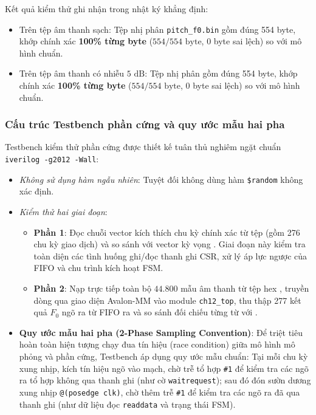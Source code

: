 Kết quả kiểm thử ghi nhận trong nhật ký  khẳng định:
\begin{itemize}
    \item Trên tệp âm thanh sạch: Tệp nhị phân \texttt{pitch\_f0.bin} gồm đúng 554 byte, khớp chính xác \textbf{100\% từng byte} ($554 / 554\text{ byte}$, 0 byte sai lệch) so với mô hình chuẩn.
    \item Trên tệp âm thanh có nhiễu $5\text{ dB}$: Tệp nhị phân gồm đúng 554 byte, khớp chính xác \textbf{100\% từng byte} ($554 / 554\text{ byte}$, 0 byte sai lệch) so với mô hình chuẩn.
\end{itemize}

\subsubsection*{Cấu trúc Testbench phần cứng và quy ước mẫu hai pha}
Testbench kiểm thử phần cứng  được thiết kế tuân thủ nghiêm ngặt chuẩn \texttt{iverilog -g2012 -Wall}:
\begin{itemize}
    \item \emph{Không sử dụng hàm ngẫu nhiên}: Tuyệt đối không dùng hàm \texttt{\$random} không xác định.
    \item \emph{Kiểm thử hai giai đoạn}:
    \begin{itemize}
        \item \textbf{Phần 1}: Đọc chuỗi vector kích thích chu kỳ chính xác từ tệp  (gồm 276 chu kỳ giao dịch) và so sánh với vector kỳ vọng . Giai đoạn này kiểm tra toàn diện các tình huống ghi/đọc thanh ghi CSR, xử lý áp lực ngược của FIFO và chu trình kích hoạt FSM.
        \item \textbf{Phần 2}: Nạp trực tiếp toàn bộ $44.800$ mẫu âm thanh từ tệp hex , truyền dòng qua giao diện Avalon-MM vào module \texttt{ch12\_top}, thu thập 277 kết quả $F_0$ ngõ ra từ FIFO ra và so sánh đối chiếu từng từ với .
    \end{itemize}
    \item \textbf{Quy ước mẫu hai pha (2-Phase Sampling Convention)}:
    Để triệt tiêu hoàn toàn hiện tượng chạy đua tín hiệu (race condition) giữa mô hình mô phỏng và phần cứng, Testbench áp dụng quy ước mẫu chuẩn:
    Tại mỗi chu kỳ xung nhịp, kích tín hiệu ngõ vào mạch, chờ trễ tổ hợp \texttt{\#1} để kiểm tra các ngõ ra tổ hợp không qua thanh ghi (như cờ \texttt{waitrequest}); sau đó đón sườn dương xung nhịp \texttt{@(posedge clk)}, chờ thêm trễ \texttt{\#1} để kiểm tra các ngõ ra đã qua thanh ghi (như dữ liệu đọc \texttt{readdata} và trạng thái FSM).
\end{itemize}

